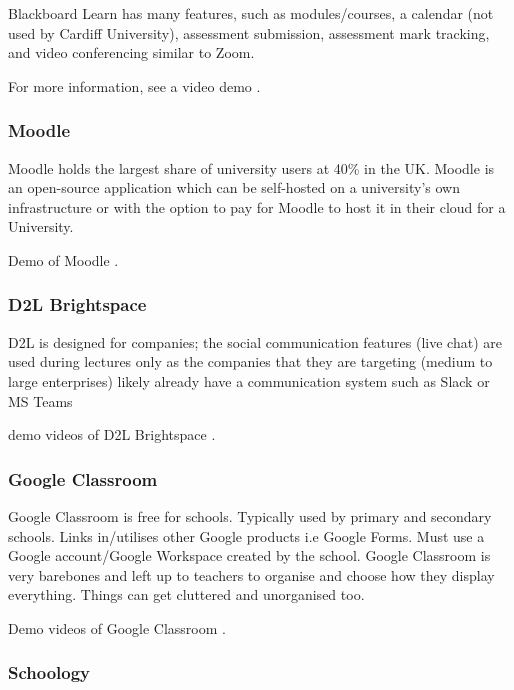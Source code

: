 Blackboard Learn has many features, such as modules/courses, a calendar (not used by Cardiff University), assessment submission, assessment mark tracking, and video conferencing similar to Zoom.

For more information, see a video demo \cite{blackboard_learn_demo}.

\subsubsection{Moodle}

Moodle \cite{moodle} holds the largest share of university users at 40\% \cite{neilmosley_VLEs} in the UK. Moodle is an open-source application which can be self-hosted on a university's own infrastructure or with the option to pay for Moodle to host it in their cloud for a University.

Demo of Moodle \cite{moodle_demo_1}\cite{moodle_demo_2}\cite{moodle_demo_3}.

\subsubsection{D2L Brightspace}

D2L is designed for companies; the social communication features (live chat) are used during lectures only as  the companies that they are targeting (medium to large enterprises) likely already have a communication system such as Slack or MS Teams 

demo videos of D2L Brightspace \cite{Brightspace_demo_1}\cite{Brightspace_demo_2}\cite{Brightspace_demo_3}.

\subsubsection{Google Classroom}

Google Classroom is free for schools. Typically used by primary and secondary schools. Links in/utilises other Google products i.e Google Forms. Must use a Google account/Google Workspace created by the school. Google Classroom is very barebones and left up to teachers to organise and choose how they display everything. Things can get cluttered and unorganised too.

Demo videos of Google Classroom \cite{google_classroom_demo_1}\cite{google_classroom_demo_2}.

\subsubsection{Schoology}

